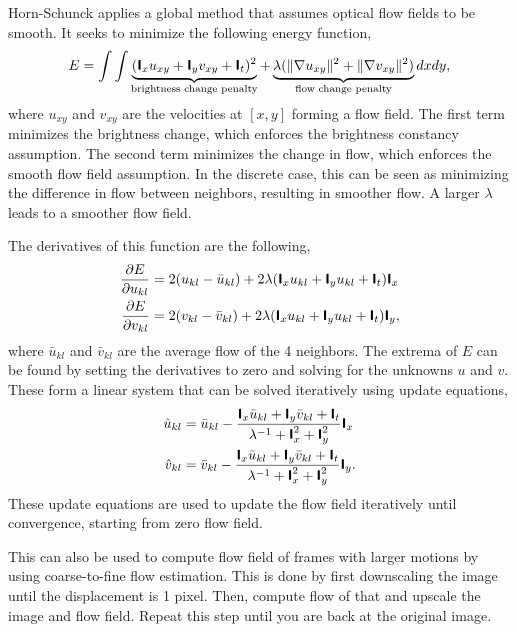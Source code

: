 Horn-Schunck applies a global method that assumes optical flow fields to be
smooth. It seeks to minimize the following energy function, \[
  E = \int\int \underbrace{(\bm{\mathsf{I}}_x u_{xy} + \bm{\mathsf{I}}_y v_{xy} + \bm{\mathsf{I}}_t)^2}_{\text{brightness change penalty}} + \underbrace{\lambda (\lVert \nabla u_{xy} \rVert^2 + \lVert \nabla v_{xy} \rVert^2)}_{\text{flow change penalty}} dxdy
,\]
where $u_{xy}$ and $v_{xy}$ are the velocities at $[x,y]$ forming a flow field.
The first term minimizes the brightness change, which enforces the brightness
constancy assumption. The second term minimizes the change in flow, which
enforces the smooth flow field assumption. In the discrete case, this can be
seen as minimizing the difference in flow between neighbors, resulting in
smoother flow. A larger $\lambda$ leads to a smoother flow field.

The derivatives of this function are the following,
\begin{align*}
  \pdv{E}{u_{kl}} &= 2(u_{kl} - \bar{u}_{kl}) + 2\lambda (\bm{\mathsf{I}}_x u_{kl} + \bm{\mathsf{I}}_y u_{kl}+ \bm{\mathsf{I}}_t) \bm{\mathsf{I}}_x \\
  \pdv{E}{v_{kl}} &= 2(v_{kl} - \bar{v}_{kl}) + 2\lambda (\bm{\mathsf{I}}_x u_{kl} + \bm{\mathsf{I}}_y u_{kl}+ \bm{\mathsf{I}}_t) \bm{\mathsf{I}}_y
,\end{align*}
where $\bar{u}_{kl}$ and $\bar{v}_{kl}$ are the average flow of the 4
neighbors. The extrema of $E$ can be found by setting the derivatives to zero
and solving for the unknowns $u$ and $v$. These form a linear system that can
be solved iteratively using update equations,
\begin{align*}
  \hat{u}_{kl} &= \bar{u}_{kl} - \frac{\bm{\mathsf{I}}_x \bar{u}_{kl} + \bm{\mathsf{I}}_y \bar{v}_{kl} + \bm{\mathsf{I}}_t}{\lambda^{-1} + \bm{\mathsf{I}}_x^2 + \bm{\mathsf{I}}_y^2} \bm{\mathsf{I}}_x \\
  \hat{v}_{kl} &= \bar{v}_{kl} - \frac{\bm{\mathsf{I}}_x \bar{u}_{kl} + \bm{\mathsf{I}}_y \bar{v}_{kl} + \bm{\mathsf{I}}_t}{\lambda^{-1} + \bm{\mathsf{I}}_x^2 + \bm{\mathsf{I}}_y^2} \bm{\mathsf{I}}_y
.\end{align*}
These update equations are used to update the flow field iteratively until
convergence, starting from zero flow field.

This can also be used to compute flow field of frames with larger motions by
using coarse-to-fine flow estimation. This is done by first downscaling the
image until the displacement is 1 pixel. Then, compute flow of that and
upscale the image and flow field. Repeat this step until you are back at the
original image.
